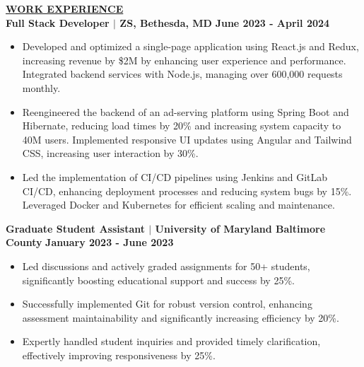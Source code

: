 \documentclass{article}
\begin{document}
\vspace{2mm} 

\noindent \textbf{\underline{WORK EXPERIENCE}} \\
\noindent \textbf{Full Stack Developer $\mid$ ZS, Bethesda, MD}  \hfill \textbf{June 2023 - April 2024}
\begin{itemize}[noitemsep,nolistsep,leftmargin=*]
\item {\small Developed and optimized a single-page application using React.js and Redux, increasing revenue by \$2M by enhancing user experience and performance. Integrated backend services with Node.js, managing over 600,000 requests monthly.}
\item {\small Reengineered the backend of an ad-serving platform using Spring Boot and Hibernate, reducing load times by 20\% and increasing system capacity to 40M users. Implemented responsive UI updates using Angular and Tailwind CSS, increasing user interaction by 30\%.}
\item {\small Led the implementation of CI/CD pipelines using Jenkins and GitLab CI/CD, enhancing deployment processes and reducing system bugs by 15\%. Leveraged Docker and Kubernetes for efficient scaling and maintenance.}
\end{itemize}

\vspace{2mm} 

\noindent \textbf{Graduate Student Assistant $\mid$ University of Maryland Baltimore County}  \hfill \textbf{January 2023 - June 2023}
\begin{itemize}[noitemsep,nolistsep,leftmargin=*]
\item {\small Led discussions and actively graded assignments for 50+ students, significantly boosting educational support and success by 25\%.}
\item {\small Successfully implemented Git for robust version control, enhancing assessment maintainability and significantly increasing efficiency by 20\%.}
\item {\small Expertly handled student inquiries and provided timely clarification, effectively improving responsiveness by 25\%.}
\end{itemize}

\vspace{2mm} 
\end{document}
